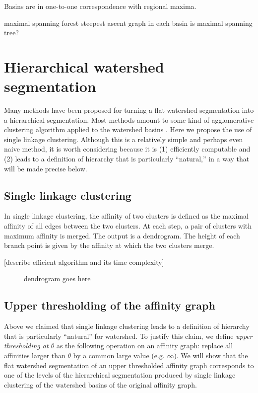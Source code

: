 \documentclass{article}
\begin{document}
Basins are in one-to-one correspondence with regional maxima.

maximal spanning forest
steepest ascent graph in each basin is maximal spanning tree?

\section{Hierarchical watershed segmentation}
Many methods have been proposed for turning a flat watershed
segmentation into a hierarchical segmentation.  Most methods amount to
some kind of agglomerative clustering algorithm applied to the
watershed basins \cite{beucher1994watershed, najman1996geodesic}.  Here we
propose the use of single linkage clustering.  Although this is a
relatively simple and perhaps even naive method, it is worth
considering because it is (1) efficiently computable and (2) leads to
a definition of hierarchy that is particularly ``natural,'' in a way
that will be made precise below.

\subsection{Single linkage clustering}
In single linkage clustering, the affinity of two clusters is defined
as the maximal affinity of all edges between the two clusters.  At
each step, a pair of clusters with maximum affinity is merged.  The
output is a dendrogram.  The height of each branch point is given by
the affinity at which the two clusters merge.

[describe efficient algorithm and its time complexity]


\begin{figure}
\caption{dendrogram goes here}
\end{figure}

\subsection{Upper thresholding of the affinity graph}
Above we claimed that single linkage clustering leads to a definition
of hierarchy that is particularly ``natural'' for watershed.  To
justify this claim, we define \emph{upper thresholding at $\theta$} as
the following operation on an affinity graph: replace all affinities
larger than $\theta$ by a common large value (e.g. $\infty$).  We will
show that the flat watershed segmentation of an upper thresholded
affinity graph corresponds to one of the levels of the hierarchical
segmentation produced by single linkage clustering of the watershed
basins of the original affinity graph.
\end{document}
